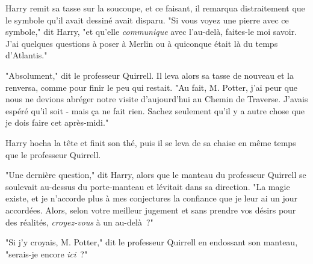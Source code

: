 Harry remit sa tasse sur la soucoupe, et ce faisant, il remarqua distraitement que le symbole qu'il avait dessiné avait disparu. "Si vous voyez une pierre avec ce symbole," dit Harry, "et qu'elle \emph{communique} avec l'au-delà, faites-le moi savoir. J'ai quelques questions à poser à Merlin ou à quiconque était là du temps d'Atlantis."

"Absolument," dit le professeur Quirrell. Il leva alors sa tasse de nouveau et la renversa, comme pour finir le peu qui restait. "Au fait, M. Potter, j'ai peur que nous ne devions abréger notre visite d'aujourd'hui au Chemin de Traverse. J'avais espéré qu'il soit - mais ça ne fait rien. Sachez seulement qu'il y a autre chose que je dois faire cet après-midi."

Harry hocha la tête et finit son thé, puis il se leva de sa chaise en même temps que le professeur Quirrell.

"Une dernière question," dit Harry, alors que le manteau du professeur Quirrell se soulevait au-dessus du porte-manteau et lévitait dans sa direction. "La magie existe, et je n'accorde plus à mes conjectures la confiance que je leur ai un jour accordées. Alors, selon votre meilleur jugement et sans prendre vos désirs pour des réalités, \emph{croyez-vous} à un au-delà~?"

"Si j'y croyais, M. Potter," dit le professeur Quirrell en endossant son manteau, "serais-je encore \emph{ici}~?"

